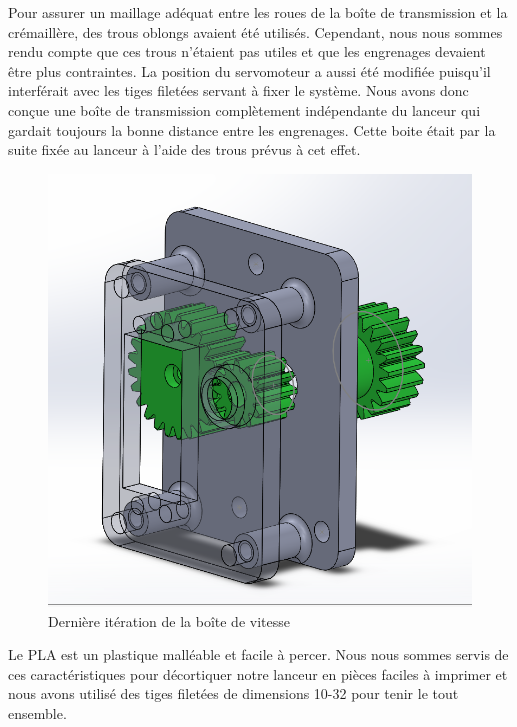 Pour assurer un maillage adéquat entre les roues de la boîte de transmission et la crémaillère, des trous oblongs avaient été utilisés.
Cependant, nous nous sommes rendu compte que ces trous n'étaient pas utiles et que les engrenages devaient être plus contraintes.
La position du servomoteur a aussi été modifiée puisqu’il interférait avec les tiges filetées servant à fixer le système.
Nous avons donc conçue une boîte de transmission complètement indépendante du lanceur qui gardait toujours la bonne distance entre les engrenages.
Cette boite était par la suite fixée au lanceur à l’aide des trous prévus à cet effet.

\begin{figure}[h!]
    \centering
    \includegraphics[width=0.4\linewidth]{img/s2/cad/gearbox2}
    \caption{Dernière itération de la boîte de vitesse}
    \label{fig:s2-cad-gearbox2}
\end{figure}

Le PLA est un plastique malléable et facile à percer.
Nous nous sommes servis de ces caractéristiques pour décortiquer notre lanceur en pièces faciles à imprimer et nous avons utilisé des tiges filetées de dimensions 10-32 pour tenir le tout ensemble.


